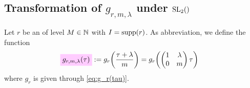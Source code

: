 \documentclass{article}
\begin{document}
\subsection{Transformation of $g_{r,m,\lambda}$ under $\SL2Z$}

Let $r$ be an  of level $M\in\mathbb{N}$ with
$I=\operatorname{supp}(r)$.
%
As abbreviation, we define the function
\begin{align}
  \defineNotation[g-r-m-lambda-tau]{g_{r,m,\lambda}(\tau)}
  &:=
    g_r\!\left(\frac{\tau+\lambda}{m}\right)
    =
  g_r\!\left(
    \begin{pmatrix}1& \lambda\\0&m\end{pmatrix}
    \tau \right)
  \label{eq:g_r-m-lambda(tau)}
\end{align}
where $g_r$ is given through \eqref{eq:g_r(tau)}.
\end{document}
